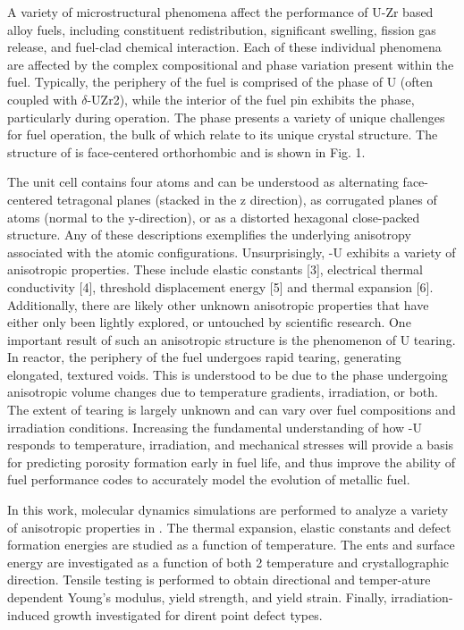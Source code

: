 \documentclass[review]{elsarticle}
\begin{document}
A variety of microstructural phenomena affect the performance of U-Zr based alloy fuels, including constituent redistribution, significant swelling,  fission gas release, and fuel-clad chemical interaction. Each of these individual phenomena are affected by the complex compositional and phase variation present within the fuel. Typically, the periphery of the fuel is comprised of the phase of U (often coupled with $\delta$-UZr2), while the interior of the fuel pin exhibits the  phase, particularly during operation. The  phase presents a variety of unique challenges for fuel operation, the bulk of which relate to its unique crystal structure. The structure of  is face-centered orthorhombic and is shown in Fig. 1.

The unit cell contains four atoms and can be understood as alternating face-centered tetragonal planes (stacked in the z direction), as corrugated planes of atoms (normal to the y-direction), or as a distorted hexagonal close-packed structure. Any of these descriptions exemplifies the underlying anisotropy associated with the atomic configurations. Unsurprisingly, -U exhibits a variety of anisotropic properties. These include elastic constants [3], electrical thermal conductivity [4], threshold displacement energy [5] and thermal expansion [6]. Additionally, there are likely other unknown anisotropic properties that have either only been lightly explored, or untouched by scientific research. One important result of such an anisotropic structure is the phenomenon of U tearing. In reactor, the periphery of the fuel undergoes rapid tearing, generating elongated, textured voids. This is understood to be due to the phase undergoing anisotropic volume changes due to temperature gradients, irradiation, or both. The extent of tearing is largely unknown and can vary over fuel compositions and irradiation conditions. Increasing the fundamental understanding of how -U responds to temperature, irradiation, and mechanical stresses will provide a basis for predicting porosity formation early in fuel life, and thus improve the ability of fuel performance codes to accurately model the evolution of metallic fuel.

In this work, molecular dynamics simulations are performed to analyze a variety of anisotropic properties in . The thermal expansion, elastic constants and defect formation energies are studied as a function of temperature. The ents and surface energy are investigated as a function of both 2 temperature and crystallographic direction. Tensile testing is performed to obtain directional and temper-ature dependent Young's modulus, yield strength, and yield strain. Finally, irradiation-induced growth investigated for dirent point defect types.
\end{document}
